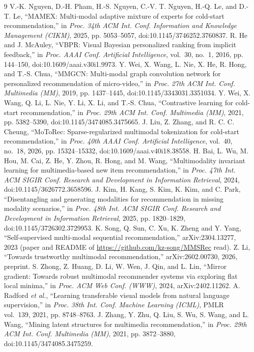 \documentclass[conference]{IEEEtran}
\begin{document}
\begin{thebibliography}{9}
 V.-K. Nguyen, D.-H. Pham, H.-S. Nguyen, C.-V. T. Nguyen, H.-Q. Le, and D.-T. Le, ``{MAMEX}: Multi-modal adaptive mixture of experts for cold-start recommendation,'' in \emph{Proc. 34th ACM Int. Conf. Information and Knowledge Management (CIKM)}, 2025, pp. 5053--5057, doi:10.1145/3746252.3760837.
 R. He and J. McAuley, ``{VBPR}: Visual Bayesian personalized ranking from implicit feedback,'' in \emph{Proc. AAAI Conf. Artificial Intelligence}, vol.~30, no.~1, 2016, pp. 144--150, doi:10.1609/aaai.v30i1.9973.
 Y. Wei, X. Wang, L. Nie, X. He, R. Hong, and T.-S. Chua, ``{MMGCN}: Multi-modal graph convolution network for personalized recommendation of micro-video,'' in \emph{Proc. 27th ACM Int. Conf. Multimedia (MM)}, 2019, pp. 1437--1445, doi:10.1145/3343031.3351034.
 Y. Wei, X. Wang, Q. Li, L. Nie, Y. Li, X. Li, and T.-S. Chua, ``Contrastive learning for cold-start recommendation,'' in \emph{Proc. 29th ACM Int. Conf. Multimedia (MM)}, 2021, pp. 5382--5390, doi:10.1145/3474085.3475665.
 J. Liu, Z. Zhang, and R. C. C. Cheung, ``{MoToRec}: Sparse-regularized multimodal tokenization for cold-start recommendation,'' in \emph{Proc. 40th AAAI Conf. Artificial Intelligence}, vol.~40, no.~18, 2026, pp. 15324--15332, doi:10.1609/aaai.v40i18.38558.
 H. Bai, L. Wu, M. Hou, M. Cai, Z. He, Y. Zhou, R. Hong, and M. Wang, ``Multimodality invariant learning for multimedia-based new item recommendation,'' in \emph{Proc. 47th Int. ACM SIGIR Conf. Research and Development in Information Retrieval}, 2024, doi:10.1145/3626772.3658596.
 J. Kim, H. Kang, S. Kim, K. Kim, and C. Park, ``Disentangling and generating modalities for recommendation in missing modality scenarios,'' in \emph{Proc. 48th Int. ACM SIGIR Conf. Research and Development in Information Retrieval}, 2025, pp. 1820--1829, doi:10.1145/3726302.3729953.
 K. Song, Q. Sun, C. Xu, K. Zheng and Y. Yang, ``Self-supervised multi-modal sequential recommendation,'' arXiv:2304.13277, 2023 (paper and README of \url{https://github.com/kz-song/MMSRec} read).
 Z. Li, ``Towards trustworthy multimodal recommendation,'' arXiv:2602.00730, 2026, preprint.
 S. Zhong, Z. Huang, D. Li, W. Wen, J. Qin, and L. Lin, ``Mirror gradient: Towards robust multimodal recommender systems via exploring flat local minima,'' in \emph{Proc. ACM Web Conf. (WWW)}, 2024, arXiv:2402.11262.
 A. Radford \emph{et al.}, ``Learning transferable visual models from natural language supervision,'' in \emph{Proc. 38th Int. Conf. Machine Learning (ICML)}, PMLR vol.~139, 2021, pp. 8748--8763.
 J. Zhang, Y. Zhu, Q. Liu, S. Wu, S. Wang, and L. Wang, ``Mining latent structures for multimedia recommendation,'' in \emph{Proc. 29th ACM Int. Conf. Multimedia (MM)}, 2021, pp. 3872--3880, doi:10.1145/3474085.3475259.
\end{thebibliography}
\end{document}
